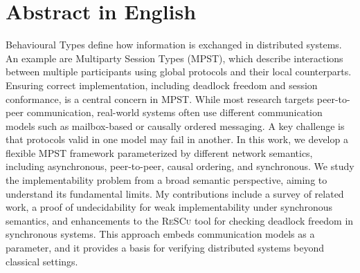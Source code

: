 \documentclass[12pt,a4paper,twoside]{book}
\theoremstyle{definition}
\theoremstyle{definition}
\theoremstyle{definition}
\begin{document}
\chapter*{Abstract in English}
Behavioural Types define how information is exchanged in distributed systems.
An example are Multiparty Session Types (MPST), which describe interactions between 
multiple participants
using global protocols and their local counterparts. Ensuring correct implementation,
including deadlock freedom and session conformance, is a central concern in MPST.
While most research targets peer-to-peer communication, real-world systems often
use different communication models such as mailbox-based or causally ordered messaging.
A key challenge is that protocols valid in one model may fail in another.
In this work, we develop a flexible MPST framework parameterized by different network
semantics, including asynchronous, peer-to-peer, causal ordering, and synchronous.
We study the implementability problem from a broad semantic perspective, aiming to
understand its fundamental limits. My contributions include a survey
of related work, a proof of undecidability for weak implementability under synchronous
semantics, and enhancements to the \textsc{ReSCu} tool for checking deadlock freedom in
synchronous systems. This approach embeds communication models as a parameter, and it
provides a basis for verifying distributed systems beyond classical settings.

\thispagestyle{plain}
\topmargin=-1cm
\cleardoublepage
{}
{}
\tableofcontents
\thispagestyle{empty}
\cleardoublepage
{}
{}
\listoftables
\thispagestyle{empty}
\cleardoublepage
{}
{}
\listoffigures
\thispagestyle{empty}
\cleardoublepage
{}
{}
\lstlistoflistings
\thispagestyle{empty}
\newpage~\newpage

\raggedbottom



% 











\newpage

{}



% 

\newpage


\end{document}
